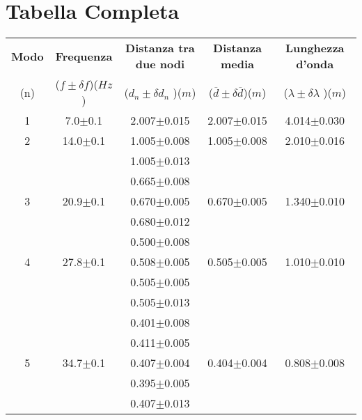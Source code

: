 \documentclass[12pt, a4paper]{article}
\begin{document}
\section{Tabella Completa}
{
\renewcommand\arraystretch{1.08} %


\begin{table}[h!] %
    \centering
    \begin{tabular}{|c|c|c|c|c|} %
    
    \hline %
    \textbf{Modo} & \textbf{Frequenza} & \textbf{Distanza tra due nodi} & \textbf{Distanza media} & \textbf{Lunghezza d'onda} \\ (n) & ($f\pm\delta f$)($Hz$) & ($d_n\pm\delta d_n$ )($m$) & ($\overline{d}\pm\delta\overline{d}$)($m$) & ($\lambda\pm\delta\lambda$ )($m$) \\ [1ex] 
    
    \hline\hline %
1 & 7.0$\pm$0.1  & 2.007$\pm$0.015 & 2.007$\pm$0.015 & 4.014$\pm$0.030 \\ [0.7ex] %
    
    \hline %
2 & 14.0$\pm$0.1 & 1.005$\pm$0.008 & 1.005$\pm$0.008 & 2.010$\pm$0.016 \\ [0.7ex]
       &              & 1.005$\pm$0.013 &                 &            \\ [0.7ex]
    
    \hline
       &              & 0.665$\pm$0.008 &                 &            \\ [0.7ex]
3 & 20.9$\pm$0.1 & 0.670$\pm$0.005 & 0.670$\pm$0.005 & 1.340$\pm$0.010 \\ [0.7ex]
       &              & 0.680$\pm$0.012 &                 &            \\ [0.7ex]
    
    \hline 
       &              & 0.500$\pm$0.008 &                 &            \\ [0.7ex]
4 & 27.8$\pm$0.1 & 0.508$\pm$0.005 & 0.505$\pm$0.005 & 1.010$\pm$0.010 \\ [0.7ex]
       &              & 0.505$\pm$0.005 &                 &            \\ [0.7ex]
       &              & 0.505$\pm$0.013 &                 &            \\ [0.7ex]
   
    \hline %
       &              & 0.401$\pm$0.008 &                 &            \\ [0.7ex]
       &              & 0.411$\pm$0.005 &                 &            \\ [0.7ex]
5 & 34.7$\pm$0.1 & 0.407$\pm$0.004 & 0.404$\pm$0.004 & 0.808$\pm$0.008 \\ [0.7ex]
       &              & 0.395$\pm$0.005 &                 &            \\ [0.7ex]
       &              & 0.407$\pm$0.013 &                 &            \\ [0.7ex]
     

\end{tabular}
\end{table}}
\end{document}
